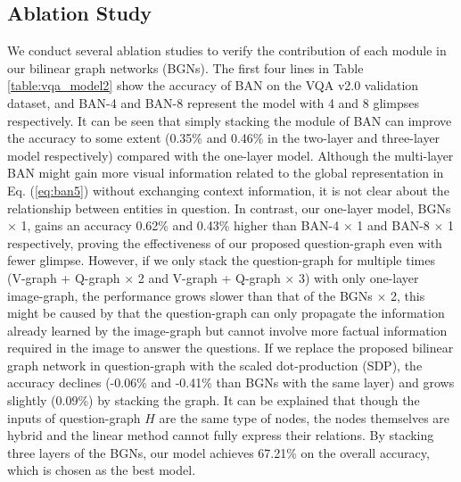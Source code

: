 \documentclass[10pt,twocolumn,letterpaper]{article}
\begin{document}
\subsection{Ablation Study}
We conduct several ablation studies to verify the contribution of each module in our bilinear graph networks (BGNs). The first four lines in Table \ref{table:vqa_model2} show the accuracy of BAN on the VQA v2.0 validation dataset, and BAN-4 and BAN-8 represent the model with 4 and 8 glimpses respectively. It can be seen that simply stacking the module of BAN can improve the accuracy to some extent (0.35\% and 0.46\% in the two-layer and three-layer model respectively) compared with the one-layer model. Although the multi-layer BAN might gain more visual information related to the global representation in Eq. (\ref{eq:ban5}) without exchanging context information, it is not clear about the relationship between entities in question. In contrast, our one-layer model, BGNs $\times$ 1, gains an accuracy 0.62\% and 0.43\% higher than BAN-4 $\times$ 1 and BAN-8 $\times$ 1 respectively, proving the effectiveness of our proposed question-graph even with fewer glimpse. However, if we only stack the question-graph for multiple times (V-graph + Q-graph $\times$ 2 and V-graph + Q-graph $\times$ 3) with only one-layer image-graph, the performance grows slower than that of the BGNs $\times$ 2, this might be caused by that the question-graph can only propagate the information already learned by the image-graph but cannot involve more factual information required in the image to answer the questions. If we replace the proposed bilinear graph network in question-graph with the scaled dot-production (SDP), the accuracy declines (-0.06\% and -0.41\% than BGNs with the same layer) and grows slightly (0.09\%) by stacking the graph. It can be explained that though the inputs of question-graph $H$ are the same type of nodes, the nodes themselves are hybrid and the linear method cannot fully express their relations. By stacking three layers of the BGNs, our model achieves 67.21\% on the overall accuracy, which is chosen as the best model.
\end{document}
